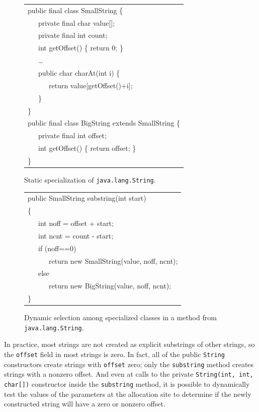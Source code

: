 \documentclass{sig-alt-full}
\begin{document}
\begin{figure}[tp]
\renewcommand{\baselinestretch}{0.6}%
{\small\tt\renewcommand{\>}{~~~}\begin{tabular}[t]{l}%
public final class SmallString \{\\
\>private final char value[];\\
\>private final int count;\\
\>int getOffset() \{ return 0; \}\\
\>\ldots\\
\>public char charAt(int i) \{\\
\>\>return value[getOffset()+i];\\
\>\}\\
\}\\
public final class BigString extends SmallString \{\\
\>private final int offset;\\
\>int getOffset() \{ return offset; \}\\
\}\\
\end{tabular}}%
\caption{Static specialization of {\tt java.lang.String}.}
\label{fig:split}
\end{figure}
\begin{figure}[tp]
\renewcommand{\baselinestretch}{0.6}%
{\small\tt\renewcommand{\>}{~~~}\begin{tabular}[t]{l}%
public SmallString substring(int start)\\
\{\\
\>int noff = offset + start;\\
\>int ncnt = count - start;\\
\>if (noff==0)\\
\>\>return new SmallString(value, noff, ncnt);\\
\>else\\
\>\>return new BigString(value, noff, ncnt);\\
\}\\
\end{tabular}}%
\caption{Dynamic selection among specialized classes in a method
             from {\tt java.lang.String}.
}
\label{fig:dynsel}
\end{figure}

In practice, most strings are not created as explicit substrings of other
strings, so
the {\tt offset} field in most strings is zero.
In fact, all of the public {\tt String} constructors create
strings with {\tt offset} zero; only the {\tt substring} method
creates strings with a nonzero offset. And even at 
calls to the private {\tt String(int, int, char[])} constructor
inside the {\tt substring} method, it is possible to dynamically
test the values of the parameters at the allocation site to determine
if the newly
constructed string will have a zero or nonzero offset.
\end{document}
